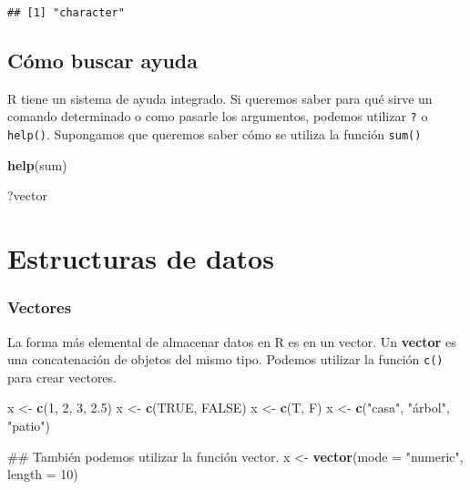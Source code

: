 \documentclass[spanish,]{book}
\newenvironment{Shaded}{\begin{snugshade}}{\end{snugshade}}
\newcommand{\KeywordTok}[1]{\textcolor[rgb]{0.13,0.29,0.53}{\textbf{#1}}}
\newcommand{\DataTypeTok}[1]{\textcolor[rgb]{0.13,0.29,0.53}{#1}}
\newcommand{\DecValTok}[1]{\textcolor[rgb]{0.00,0.00,0.81}{#1}}
\newcommand{\FloatTok}[1]{\textcolor[rgb]{0.00,0.00,0.81}{#1}}
\newcommand{\StringTok}[1]{\textcolor[rgb]{0.31,0.60,0.02}{#1}}
\newcommand{\OtherTok}[1]{\textcolor[rgb]{0.56,0.35,0.01}{#1}}
\newcommand{\NormalTok}[1]{#1}
\begin{document}
\begin{verbatim}
## [1] "character"
\end{verbatim}

\section{Cómo buscar ayuda}\label{como-buscar-ayuda}

R tiene un sistema de ayuda integrado. Si queremos saber para qué sirve
un comando determinado o como pasarle los argumentos, podemos utilizar
\texttt{?} o \texttt{help()}. Supongamos que queremos saber cómo se
utiliza la función \texttt{sum()}

\begin{Shaded}
\begin{Highlighting}[]
\KeywordTok{help}\NormalTok{(sum)}

\NormalTok{?vector}
\end{Highlighting}
\end{Shaded}

\chapter{Estructuras de datos}\label{estructuras-de-datos}

\subsection{Vectores}\label{vectores}

La forma más elemental de almacenar datos en R es en un vector. Un
\textbf{vector} es una concatenación de objetos del mismo tipo. Podemos
utilizar la función \texttt{c()} para crear vectores.

\begin{Shaded}
\begin{Highlighting}[]
\NormalTok{x <-}\StringTok{ }\KeywordTok{c}\NormalTok{(}\DecValTok{1}\NormalTok{, }\DecValTok{2}\NormalTok{, }\DecValTok{3}\NormalTok{, }\FloatTok{2.5}\NormalTok{)}
\NormalTok{x <-}\StringTok{ }\KeywordTok{c}\NormalTok{(}\OtherTok{TRUE}\NormalTok{, }\OtherTok{FALSE}\NormalTok{)}
\NormalTok{x <-}\StringTok{ }\KeywordTok{c}\NormalTok{(T, F)}
\NormalTok{x <-}\StringTok{ }\KeywordTok{c}\NormalTok{(}\StringTok{"casa"}\NormalTok{, }\StringTok{"árbol"}\NormalTok{, }\StringTok{"patio"}\NormalTok{)}

\NormalTok{## También podemos utilizar la función vector.}
\NormalTok{x <-}\StringTok{ }\KeywordTok{vector}\NormalTok{(}\DataTypeTok{mode =} \StringTok{"numeric"}\NormalTok{, }\DataTypeTok{length =} \DecValTok{10}\NormalTok{)}
\end{Highlighting}
\end{Shaded}
\end{document}
